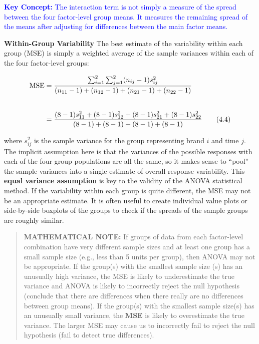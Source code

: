 \documentclass[
]{report}
\begin{document}
\textbf{\textcolor{blue}{Key Concept:}} \textcolor{blue}{The interaction term is not simply a measure of the spread between the four factor-level group means. It measures the remaining spread of the means after adjusting for differences between the main factor means.}

\textbf{Within-Group Variability} The best estimate of the variability within each group (MSE) is simply a weighted average of the sample variances within each of the four factor-level groups:

\begin{align}
\text{MSE} &= 
\frac{\sum_{i=1}^{2}\sum_{j=1}^{2}(n_{ij} - 1)s_{ij}^2}{(n_{11} - 1) + (n_{12} - 1) + (n_{21} - 1) + (n_{22} - 1)} \notag \\[2em]
&= \frac{(8 - 1)s_{11}^2 + (8 - 1)s_{12}^2 + (8 - 1)s_{21}^2 + (8 - 1)s_{22}^2}
{(8 - 1) + (8 - 1) + (8 - 1) + (8 - 1)}
\tag{4.4}\label{4.4}
\end{align}

where \(\scriptstyle s_{ij}^2\) is the sample variance for the group representing brand \(\scriptstyle i\) and time \(\scriptstyle j\). The implicit assumption here is that the variances of the possible responses with each of the four group populations are all the same, so it makes sense to ``pool'' the sample variances into a single estimate of overall response variability. This \textbf{equal variance assumption} is key to the validity of the ANOVA statistical method. If the variability within each group is quite different, the MSE may not be an appropriate estimate. It is often useful to create individual value plots or side-by-side boxplots of the groups to check if the spreads of the sample groups are roughly similar.

\begin{quote}
\textbf{MATHEMATICAL NOTE:} If groups of data from each factor-level combination have very different sample sizes and at least one group has a small sample size (e.g., less than 5 units per group), then ANOVA may not be appropriate. If the group(s) with the smallest sample size (s) has an unusually high variance, the MSE is likely to underestimate the true variance and ANOVA is likely to incorrectly reject the null hypothesis (conclude that there are differences when there really are no differences between group means). If the group(s) with the smallest sample size(s) has an unusually small variance, the \textbf{MSE} is likely to overestimate the true variance. The larger MSE may cause us to incorrectly fail to reject the null hypothesis (fail to detect true differences).
\end{quote}
\end{document}
